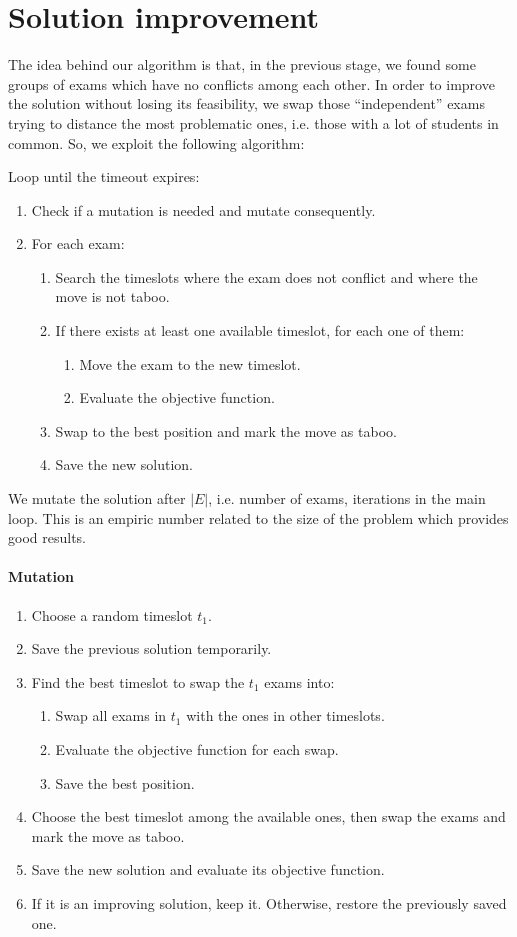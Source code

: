 \section*{Solution improvement}
The idea behind our algorithm is that, in the previous stage, we found some groups of exams which have no conflicts among each other. In order to improve the solution without losing its feasibility, we swap those ``independent'' exams trying to distance the most problematic ones, i.e. those with a lot of students in common.
So, we exploit the following algorithm:

Loop until the timeout expires:
\begin{enumerate}
\item Check if a mutation is needed and mutate consequently.
\item For each exam:
\begin{enumerate}
\item Search the timeslots where the exam does not conflict and where the move is not taboo.
\item If there exists at least one available timeslot, for each one of them:
\begin{enumerate}
\item Move the exam to the new timeslot.
\item Evaluate the objective function.
\end{enumerate}
\item Swap to the best position and mark the move as taboo.
\item Save the new solution.
\end{enumerate}
\end{enumerate}
We mutate the solution after $|E|$, i.e. number of exams, iterations in the main loop. This is an empiric number related to the size of the problem which provides good results.
\paragraph*{Mutation}
\begin{enumerate}
\item Choose a random timeslot $t_1$.
\item Save the previous solution temporarily.
\item Find the best timeslot to swap the $t_1$ exams into:
\begin{enumerate}
\item Swap all exams in $t_1$ with the ones in other timeslots.
\item Evaluate the objective function for each swap.
\item Save the best position.
\end{enumerate}
\item Choose the best timeslot among the available ones, then swap the exams and mark the move as taboo.
\item Save the new solution and evaluate its objective function.
\item If it is an improving solution, keep it. Otherwise, restore the previously saved one.
\end{enumerate}